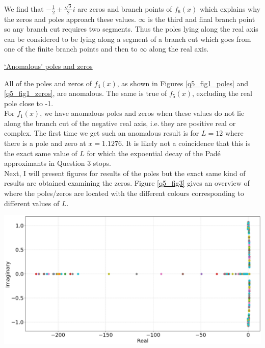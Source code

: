 \documentclass[12pt, a4paper]{article}
\begin{document}
We find that $-\frac{1}{2} \pm \frac{\sqrt{3}}{2}i$ are zeros and branch points of $f_{6}(x)$ which
explains why the zeros and poles approach these values. $\infty$ is the third and final 
branch point so any branch cut requires two segments. Thus the poles lying along the real 
axis can be considered to be lying along a segment of a branch cut which goes from one of 
the finite branch points and then to $\infty$ along the real axis.
\\
\newpage

\vspace{0.4cm}
\underline{`Anomalous' poles and zeros}

\vspace{0.5cm}
All of the poles and zeros of $f_{4}(x)$, as shown in Figures \ref{q5_fig1_poles} 
and \ref{q5_fig1_zeros}, are anomalous. The same is true of $f_{5}(x)$, excluding 
the real pole close to -1.
\\

For $f_{1}(x)$, we have anomalous poles and zeros when these values do not lie along the branch cut
of the negative real axis, i.e.$~$they are positive real or complex. The first time we get such an
anomalous result is for $L = 12$ where there is a pole and zero at $x = 1.1276$. It is likely
not a coincidence that this is the exact same value of $L$ for which the expoential
decay of the Pad\'e approximants in Question 3 stops. \\

Next, I will present 
figures for results of the poles but the exact same kind of results are obtained examining the zeros. 
Figure \ref{q5_fig3} gives an overview of where the poles/zeros are located with the different 
colours corresponding to different values of $L$.

\vspace{0.4cm}
\begin{minipage}{\textwidth}
	\centering
	\includegraphics[width=\linewidth]{q5_fig3}

	\vspace*{-0.3cm}

	\label{q5_fig3}
\end{minipage}
\\
\end{document}
